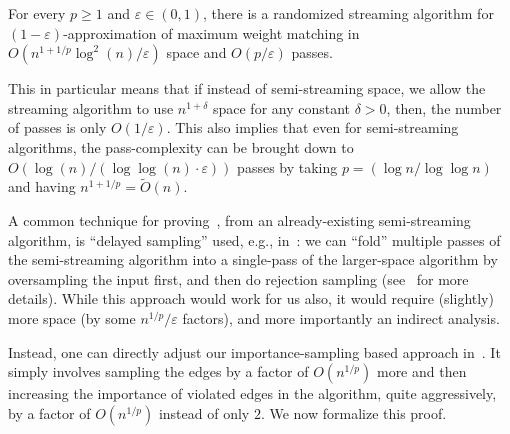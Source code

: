 \documentclass{theoretics}
\renewcommand{\geq}{\geqslant}
\newcommand{\Ot}{\widetilde{O}}
\newcommand{\eps}{\varepsilon}
\begin{document}
\begin{corollary}\label{cor:eps-pass} For every  $p \geq 1$ and  $\eps \in (0,1)$, there is a randomized streaming algorithm for $(1-\eps)$-approximation of maximum weight matching
	in $O(n^{1+1/p}  \log^2{\!(n)}/\eps)$ space and $O(p/\eps)$ passes. 
\end{corollary}

This in particular means that if instead of semi-streaming space, we allow the streaming algorithm to use $n^{1+\delta}$ space for any constant $\delta > 0$, then, the number of passes is only $O(1/\eps)$. 
This also implies that even for semi-streaming algorithms, the pass-complexity can be brought down to $O(\log{\!(n)}/(\log\log{\!(n)} \cdot \eps))$ passes by taking $p=(\log{n}/\log\log{n})$ and having $n^{1+1/p} = \Ot(n)$. 

A common technique for proving~, from an already-existing semi-streaming algorithm, is ``delayed sampling'' used, e.g., in~\cite{AhnG15,IndykMRUVY17}: 
we can ``fold'' multiple passes of the semi-streaming algorithm into a single-pass of the larger-space algorithm by oversampling the input first, and then do rejection sampling 
(see~\cite[step 2 of Section 1.3]{IndykMRUVY17} for more details). While this approach would work for us also, 
it would require (slightly) more space  (by some $n^{1/p}/\eps$ factors), and more importantly an indirect analysis. 

Instead, one can directly adjust our importance-sampling based approach in~. 
It simply involves sampling the edges by a factor of $O(n^{1/p})$ more and then  increasing the importance of violated edges in the algorithm, quite aggressively, by a factor of $O(n^{1/p})$ instead of only $2$. 
We now formalize this proof. 
\end{document}
